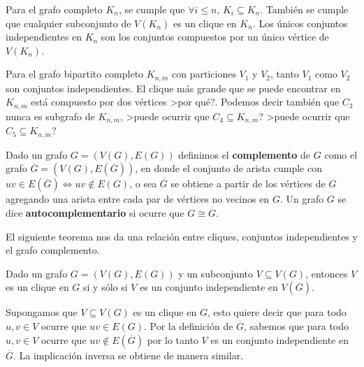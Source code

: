 \begin{ejemplo}
Para el grafo completo $K_n$, se cumple que $\forall i\leq n$, $K_i\subseteq K_n$.
También se cumple que cualquier subconjunto de $V(K_n)$ es un clique en $K_n$.
Los únicos conjuntos independientes en $K_n$ son los conjuntos compuestos por un único vértice de $V(K_n)$.

Para el grafo bipartito completo $K_{n,m}$ con particiones $V_1$ y $V_2$, tanto $V_1$ como $V_2$ son conjuntos independientes.
El clique más grande que se puede encontrar en $K_{n,m}$ está compuesto por dos vértices >por qué?.
Podemos decir también que $C_3$ nunca es subgrafo de $K_{n,m}$,
>puede ocurrir que $C_4\subseteq K_{n,m}$?
>puede ocurrir que $C_5\subseteq K_{n,m}$?
\end{ejemplo}

\begin{definicion}
Dado un grafo $G=(V(G),E(G))$ definimos el {\bf complemento} de $G$ como el grafo $\overline{G}=(V(G),E(\overline{G}))$, en donde el conjunto de arista cumple con $uv\in E(\overline G)\Leftrightarrow uv\notin E(G)$,
o sea $\overline G$ se obtiene a partir de los vértices de $G$ agregando una arista entre cada par de vértices no vecinos en $G$.
Un grafo $G$ se dice {\bf autocomplementario} si ocurre que $G\cong\overline G$.
\end{definicion}

El siguiente teorema nos da una relación entre cliques, conjuntos independientes y el grafo complemento.

\begin{teorema}
\label{teo:clique-indep}
Dado un grafo $G=(V(G),E(G))$ y un subconjunto $V\subseteq V(G)$, entonces $V$ es un clique en $G$ si y sólo si $V$ es un conjunto independiente en $V(\overline G)$.

\begin{demostracion}
Supongamos que $V\subseteq V(G)$ es un clique en $G$, esto quiere decir que para todo $u,v\in V$ ocurre que $uv\in E(G)$.
Por la definición de $\overline G$, sabemos que para todo $u,v\in V$ ocurre que $uv\notin E(\overline G)$ por lo tanto $V$ es un conjunto independiente en $\overline G$.
La implicación inversa se obtiene de manera similar.
\end{demostracion}
\end{teorema}

